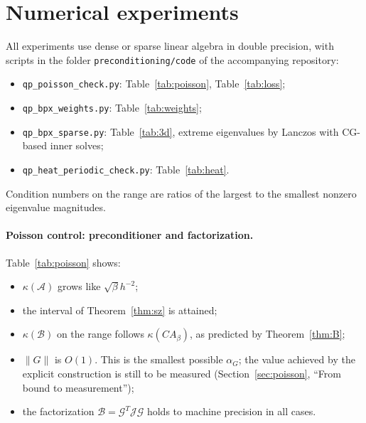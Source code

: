 \documentclass[11pt,a4paper]{article}
\newcommand{\A}{\mathcal{A}}
\newcommand{\B}{\mathcal{B}}
\newcommand{\G}{\mathcal{G}}
\newcommand{\J}{\mathcal{J}}
\theoremstyle{remark}
\begin{document}
\section{Numerical experiments}\label{sec:num}

All experiments use dense or sparse linear algebra in double precision,
with scripts in the folder \texttt{preconditioning/code} of the accompanying
repository:
\begin{itemize}
\item \texttt{qp\_poisson\_check.py}: Table~\ref{tab:poisson}, Table~\ref{tab:loss};
\item \texttt{qp\_bpx\_weights.py}: Table~\ref{tab:weights};
\item \texttt{qp\_bpx\_sparse.py}: Table~\ref{tab:3d}, extreme eigenvalues by
  Lanczos with CG-based inner solves;
\item \texttt{qp\_heat\_periodic\_check.py}: Table~\ref{tab:heat}.
\end{itemize}
Condition numbers on the range are ratios of the largest to the smallest
nonzero eigenvalue magnitudes.

\paragraph{Poisson control: preconditioner and factorization.}
Table~\ref{tab:poisson} shows:
\begin{itemize}
\item $\kappa(\A)$ grows like $\sqrt\beta h^{-2}$;
\item the interval of Theorem~\ref{thm:sz} is attained;
\item $\kappa(\B)$ on the range follows $\kappa(CA_\beta)$, as predicted by
  Theorem~\ref{thm:B};
\item $\|G\|$ is $O(1)$. This is the smallest possible $\alpha_G$; the value
  achieved by the explicit construction is still to be measured
  (Section~\ref{sec:poisson}, ``From bound to measurement'');
\item the factorization $\B=\G^T\J\G$ holds to machine precision in all
  cases.
\end{itemize}
\end{document}

